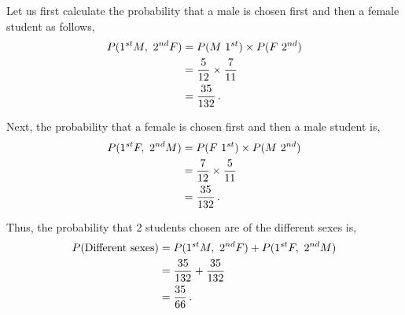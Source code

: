 \begin{subquestions}
\begin{subsubquestions}
\end{subsubquestions}


\subquestion

Let us first calculate the probability that a male is chosen first and then a female student as follows,
\begin{align}
	P(1^{st} M, ~2^{nd} F) & = P(M ~1^{st}) \times P(F ~2^{nd}) \nonumber \\
	                & = \frac{5}{12} \times \frac{7}{11} \nonumber \\
	                & = \frac{35}{132} \,. 
\end{align}

Next, the probability that a female is chosen first and then a male student is,
\begin{align}
	P(1^{st} F, ~2^{nd} M) & = P(F ~1^{st}) \times P(M ~2^{nd}) \nonumber \\
	& = \frac{7}{12} \times \frac{5}{11} \nonumber \\
	& = \frac{35}{132} \,. 
\end{align}

Thus, the probability that 2 students chosen are of the different sexes is,
\begin{align}
	P(\text{Different sexes}) & = P(1^{st} M, ~2^{nd} F) + P(1^{st} F, ~2^{nd} M) \nonumber \\
	                          & = \frac{35}{132} + \frac{35}{132} \nonumber \\
	                          & = \frac{35}{66} \,.
\end{align}

\end{subquestions}